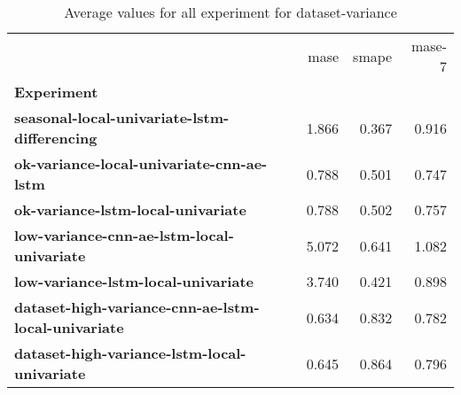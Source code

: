 \begin{table}[h]
\centering
\caption{Average values for all experiment for dataset-variance}
\label{table:Average-metric-dataset-variance}
\begin{tabular}{lrrr}
\toprule
{} &   mase &  smape &  mase-7 \\
\textbf{Experiment                                        } &        &        &         \\
\midrule
\textbf{seasonal-local-univariate-lstm-differencing       } &  1.866 &  0.367 &   0.916 \\
\textbf{ok-variance-local-univariate-cnn-ae-lstm          } &  0.788 &  0.501 &   0.747 \\
\textbf{ok-variance-lstm-local-univariate                 } &  0.788 &  0.502 &   0.757 \\
\textbf{low-variance-cnn-ae-lstm-local-univariate         } &  5.072 &  0.641 &   1.082 \\
\textbf{low-variance-lstm-local-univariate                } &  3.740 &  0.421 &   0.898 \\
\textbf{dataset-high-variance-cnn-ae-lstm-local-univariate} &  0.634 &  0.832 &   0.782 \\
\textbf{dataset-high-variance-lstm-local-univariate       } &  0.645 &  0.864 &   0.796 \\
\bottomrule
\end{tabular}
\end{table}
